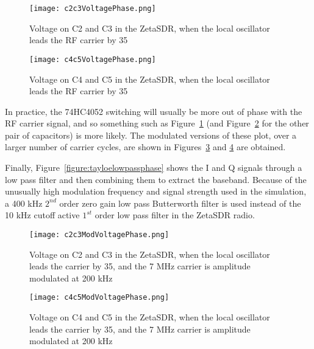 \documentclass[11pt, twoside]{article}
\begin{document}
\begin{figure}
  \center
  \captionsetup{width=.8\linewidth}
  \texttt{[image: c2c3VoltagePhase.png]}
  \caption{Voltage on C2 and C3 in the ZetaSDR, when the local
    oscillator leads the RF carrier by 35{\degree}}
  \label{figure:C2C3phase}
\end{figure}

\begin{figure}
  \center
  \captionsetup{width=.8\linewidth}
  \texttt{[image: c4c5VoltagePhase.png]}
  \caption{Voltage on C4 and C5 in the ZetaSDR, when the local
    oscillator leads the RF carrier by 35{\degree}}
  \label{figure:C4C5phase}
\end{figure}

In practice, the 74HC4052 switching will usually be more out of phase
with the RF carrier signal, and so something such as
Figure~\ref{figure:C2C3phase} (and Figure~\ref{figure:C4C5phase} for
the other pair of capacitors) is more likely.  The modulated versions
of these plot, over a larger number of carrier cycles, are shown in
Figures~\ref{figure:C2C3modphase} and \ref{figure:C4C5modphase} are
obtained.

Finally, Figure~\ref{figure:tayloelowpassphase} shows the I and Q
signals through a low pass filter and then combining them to extract
the baseband.  Because of the unusually high modulation frequency and
signal strength used in the simulation, a 400 kHz $2^{nd}$ order zero
gain low pass Butterworth filter is used instead of the 10 kHz cutoff
active $1^{st}$ order low pass filter in the ZetaSDR radio.

\begin{figure}
  \center
  \captionsetup{width=.8\linewidth}
  \texttt{[image: c2c3ModVoltagePhase.png]}
  \caption{Voltage on C2 and C3 in the ZetaSDR, when the local
    oscillator leads the carrier by 35{\degree}, and the 7 MHz carrier
    is amplitude modulated at 200 kHz}
  \label{figure:C2C3modphase}
\end{figure}

\begin{figure}
  \center
  \captionsetup{width=.8\linewidth}
  \texttt{[image: c4c5ModVoltagePhase.png]}
  \caption{Voltage on C4 and C5 in the ZetaSDR, when the local
    oscillator leads the carrier by 35{\degree}, and the 7 MHz carrier
    is amplitude modulated at 200 kHz}
  \label{figure:C4C5modphase}
\end{figure}
\end{document}
